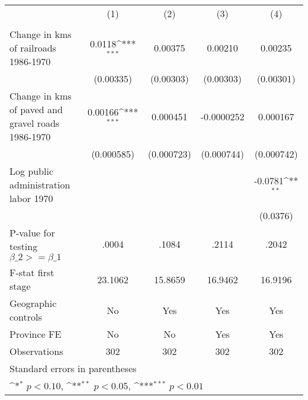 {
\def\sym#1{\ifmmode^{#1}\else\(^{#1}\)\fi}
\begin{tabular}{l*{4}{c}}
\hline\hline
                &\multicolumn{1}{c}{(1)}&\multicolumn{1}{c}{(2)}&\multicolumn{1}{c}{(3)}&\multicolumn{1}{c}{(4)}\\
                &\multicolumn{1}{c}{}&\multicolumn{1}{c}{}&\multicolumn{1}{c}{}&\multicolumn{1}{c}{}\\
\hline
Change in kms of railroads 1986-1970&   0.0118\sym{***}&  0.00375         &  0.00210         &  0.00235         \\
                &(0.00335)         &(0.00303)         &(0.00303)         &(0.00301)         \\
[1em]
Change in kms of paved and gravel roads 1986-1970&  0.00166\sym{***}& 0.000451         &-0.0000252         & 0.000167         \\
                &(0.000585)         &(0.000723)         &(0.000744)         &(0.000742)         \\
[1em]
Log public administration labor 1970&                  &                  &                  &  -0.0781\sym{**} \\
                &                  &                  &                  & (0.0376)         \\
\hline
P-value for testing $\beta\_{2} >= \beta\_{1}$&    .0004         &    .1084         &    .2114         &    .2042         \\
F-stat first stage&  23.1062         &  15.8659         &  16.9462         &  16.9196         \\
Geographic controls&       No         &      Yes         &      Yes         &      Yes         \\
Province FE     &       No         &       No         &      Yes         &      Yes         \\
Observations    &      302         &      302         &      302         &      302         \\
\hline\hline
\multicolumn{5}{l}{\footnotesize Standard errors in parentheses}\\
\multicolumn{5}{l}{\footnotesize \sym{*} \(p<0.10\), \sym{**} \(p<0.05\), \sym{***} \(p<0.01\)}\\
\end{tabular}
}
